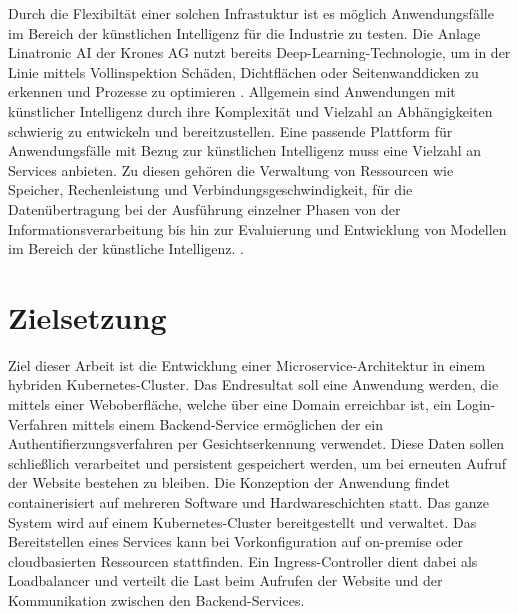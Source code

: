 Durch die Flexibiltät einer solchen Infrastuktur ist es möglich Anwendungsfälle im Bereich
der künstlichen Intelligenz
für die Industrie zu testen. Die Anlage Linatronic AI der Krones AG nutzt bereits Deep-Learning-Technologie,
um in der Linie mittels Vollinspektion Schäden, Dichtflächen oder Seitenwanddicken
zu erkennen und Prozesse zu optimieren \cite{linatronic}. Allgemein sind Anwendungen mit künstlicher Intelligenz durch ihre Komplexität
und Vielzahl an Abhängigkeiten schwierig zu entwickeln und bereitzustellen. 
Eine passende Plattform für Anwendungsfälle mit Bezug zur künstlichen Intelligenz
muss eine Vielzahl an Services anbieten. Zu diesen gehören die Verwaltung von Ressourcen wie Speicher,
Rechenleistung und Verbindungsgeschwindigkeit,
für die Datenübertragung bei der Ausführung einzelner Phasen von der Informationsverarbeitung bis hin zur Evaluierung und Entwicklung von Modellen
im Bereich der künstliche Intelligenz.
\cite{mlops}. 

\section{Zielsetzung}
Ziel dieser Arbeit ist die Entwicklung einer Microservice-Architektur in einem hybriden Kubernetes-Cluster. 
Das Endresultat soll eine Anwendung werden, die mittels einer Weboberfläche, welche über eine Domain erreichbar ist,
ein Login-Verfahren mittels einem Backend-Service ermöglichen der ein Authentifierzungsverfahren
per Gesichtserkennung verwendet. 
Diese Daten sollen schließlich verarbeitet und persistent 
gespeichert werden, um bei erneuten Aufruf der Website bestehen zu bleiben.
Die Konzeption der Anwendung findet containerisiert auf mehreren Software und Hardwareschichten
statt. 
Das ganze System wird auf einem Kubernetes-Cluster bereitgestellt und verwaltet.
Das Bereitstellen eines Services kann bei Vorkonfiguration auf on-premise oder cloudbasierten Ressourcen stattfinden.
Ein Ingress-Controller dient dabei als Loadbalancer und verteilt die Last beim 
Aufrufen der Website und der Kommunikation zwischen den Backend-Services.

